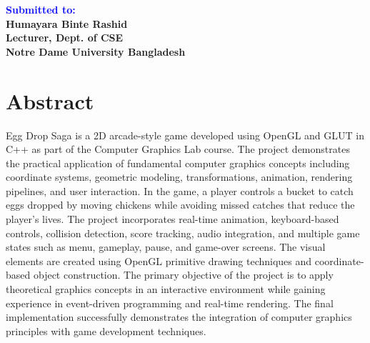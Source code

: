 \documentclass[12pt,a4paper]{report}
\begin{document}
\begin{titlepage}
\begin{center}
    \vfill
    \begin{flushleft}
        \textbf{\Huge \textcolor{blue}{Submitted to:}} \\
        \vspace{0.3cm}
        \textbf{\Large Humayara Binte Rashid} \\
        \vspace{0.3cm}
        \textbf{\Large Lecturer, Dept. of CSE} \\
        \vspace{0.3cm}
        \textbf{\Large Notre Dame University Bangladesh}
    \end{flushleft}

\end{center}
\end{titlepage}

\tableofcontents
\thispagestyle{empty}
\clearpage
{}

\pagestyle{fancy}
\fancyhf{} 							%
\rfoot{\thepage}

\chapter*{\center Abstract}
\thispagestyle{empty}

Egg Drop Saga is a 2D arcade-style game developed using OpenGL and GLUT in C++ as part of the Computer Graphics Lab course. The project demonstrates the practical application of fundamental computer graphics concepts including coordinate systems, geometric modeling, transformations, animation, rendering pipelines, and user interaction. In the game, a player controls a bucket to catch eggs dropped by moving chickens while avoiding missed catches that reduce the player's lives. The project incorporates real-time animation, keyboard-based controls, collision detection, score tracking, audio integration, and multiple game states such as menu, gameplay, pause, and game-over screens. The visual elements are created using OpenGL primitive drawing techniques and coordinate-based object construction. The primary objective of the project is to apply theoretical graphics concepts in an interactive environment while gaining experience in event-driven programming and real-time rendering. The final implementation successfully demonstrates the integration of computer graphics principles with game development techniques.
\end{document}
